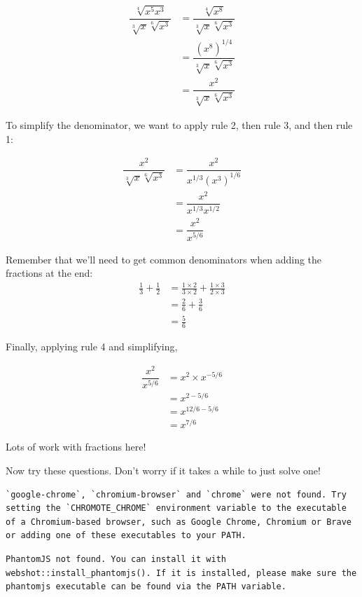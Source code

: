 \documentclass[
  a4paper,
]{scrbook}
\begin{document}
\[
\begin{aligned} \dfrac{\sqrt[4]{x^5x^3}}{\sqrt[3]{x} \sqrt[6]{x^3}} &= \dfrac{\sqrt[4]{x^8}}{\sqrt[3]{x} \sqrt[6]{x^3}} \\
 &= \dfrac{(x^8)^{1/4}}{\sqrt[3]{x} \sqrt[6]{x^3}} \\
 &= \dfrac{x^2}{\sqrt[3]{x} \sqrt[6]{x^3}}
\end{aligned}
\]

To simplify the denominator, we want to apply rule 2, then rule 3, and
then rule 1:

\[
\begin{aligned} \dfrac{x^2}{\sqrt[3]{x} \sqrt[6]{x^3}} &= \dfrac{x^2}{x^{1/3} (x^3)^{1/6}} \\
 &= \dfrac{x^2}{x^{1/3} x^{1/2}} \\
 &= \dfrac{x^2}{x^{5/6}}
\end{aligned}
\]

Remember that we'll need to get common denominators when adding the
fractions at the end: \[
\begin{aligned} \frac{1}{3} + \frac{1}{2} &= \frac{1\times2}{3\times2}  + \frac{1\times3}{2\times3} \\
&= \frac{2}{6}  + \frac{3}{6} \\
&= \frac{5}{6}
\end{aligned}
\]

Finally, applying rule 4 and simplifying,

\[
\begin{aligned} \dfrac{x^2}{x^{5/6}} &=x^2 \times x^{-5/6} \\
 &= x^{2-5/6} \\
 &= x^{12/6-5/6} \\
 &= x^{7/6}
\end{aligned}
\]

Lots of work with fractions here!

Now try these questions. Don't worry if it takes a while to just solve
one!

\begin{verbatim}
`google-chrome`, `chromium-browser` and `chrome` were not found. Try setting the `CHROMOTE_CHROME` environment variable to the executable of a Chromium-based browser, such as Google Chrome, Chromium or Brave or adding one of these executables to your PATH.
\end{verbatim}

\begin{verbatim}
PhantomJS not found. You can install it with webshot::install_phantomjs(). If it is installed, please make sure the phantomjs executable can be found via the PATH variable.
\end{verbatim}
\end{document}
